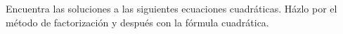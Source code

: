 \question Encuentra las soluciones a las siguientes ecuaciones cuadráticas. Házlo por el método de factorización y después con la fórmula cuadrática.

\begin{parts}
    {\printanswers
        
    }
    \newpage
    
    
    \newpage
    {\printanswers
        
        
    }
    \newpage
    
    
\end{parts}
